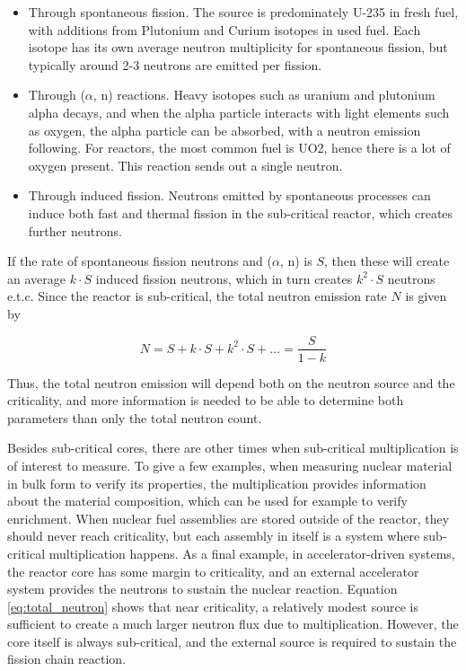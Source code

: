 \begin{itemize}
\item Through spontaneous fission. The source is predominately U-235 in fresh fuel, with additions from Plutonium and Curium isotopes in used fuel. Each isotope has its own average neutron multiplicity for spontaneous fission, but typically around 2-3 neutrons are emitted per fission.

\item Through ($\alpha$, n) reactions. Heavy isotopes such as uranium and plutonium alpha decays, and when the alpha particle interacts with light elements such as oxygen, the alpha particle can be absorbed, with a neutron emission following. For reactors, the most common fuel is UO2, hence there is a lot of oxygen present. This reaction sends out a single neutron.

\item Through induced fission. Neutrons emitted by spontaneous processes can induce both fast and thermal fission in the sub-critical reactor, which creates further neutrons. 
\end{itemize}

If the rate of spontaneous fission neutrons and ($\alpha$, n) is $S$, then these will create an average $k \cdot S$ induced fission neutrons, which in turn creates $k^2 \cdot S$ neutrons e.t.c. Since the reactor is sub-critical, the total neutron emission rate $N$ is given by

\begin{equation} \label{eq:total_neutron}
N = S + k \cdot S + k^2 \cdot S + ... = \frac{S}{1-k} 
\end{equation}

Thus, the total neutron emission will depend both on the neutron source and the criticality, and more information is needed to be able to determine both parameters than only the total neutron count.  

Besides sub-critical cores, there are other times when sub-critical multiplication is of interest to measure. To give a few examples, when measuring nuclear material in bulk form to verify its properties, the multiplication provides information about the material composition, which can be used for example to verify enrichment. When nuclear fuel assemblies are stored outside of the reactor, they should never reach criticality, but each assembly in itself is a system where sub-critical multiplication happens. As a final example, in accelerator-driven systems, the reactor core has some margin to criticality, and an external accelerator system provides the neutrons to sustain the nuclear reaction. Equation \ref{eq:total_neutron} shows that near criticality, a relatively modest source is sufficient to create a much larger neutron flux due to multiplication. However, the core itself is always sub-critical, and the external source is required to sustain the fission chain reaction.

